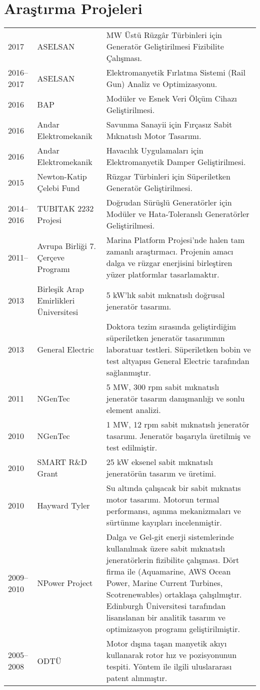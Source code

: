 \documentclass[a4paper,12pt]{article}
\begin{document}
\section{Araştırma Projeleri}
\begin{longtable}{lp{3cm}p{12cm}}
2017 & ASELSAN & MW Üstü Rüzgâr Türbinleri için Generatör Geliştirilmesi Fizibilite Çalışması.\\
2016--2017 & ASELSAN & Elektromanyetik Fırlatma Sistemi (Rail Gun) Analiz ve Optimizasyonu.\\
2016 & BAP & Modüler ve Esnek Veri Ölçüm Cihazı Geliştirilmesi.\\
2016 & Andar Elektromekanik & Savunma Sanayii için Fırçasız Sabit Mıknatıslı Motor Tasarımı.\\
2016 & Andar Elektromekanik & Havacılık Uygulamaları için Elektromanyetik Damper Geliştirilmesi.\\
2015 & Newton-Katip Çelebi Fund & Rüzgar Türbinleri için Süperiletken Generatör Geliştirilmesi.\\
2014--2016 & TUBITAK 2232 Projesi & Doğrudan Sürüşlü Generatörler için Modüler ve Hata-Toleranslı Generatörler Geliştirilmesi.\\
2011-- & Avrupa Birliği 7. Çerçeve Programı & Marina Platform Projesi'nde halen tam zamanlı araştırmacı. Projenin amacı dalga ve rüzgar enerjisini birleştiren yüzer platformlar tasarlamaktır.\\
2013 & Birleşik Arap Emirlikleri Üniversitesi & 5 kW'lık sabit mıknatıslı doğrusal jeneratör tasarımı.\\
2013 & General Electric & Doktora tezim sırasında geliştirdiğim süperiletken jeneratör tasarımının laboratuar testleri. Süperiletken bobin ve test altyapısı General Electric tarafından sağlanmıştır.\\
2011 & NGenTec & 5 MW, 300 rpm sabit mıknatıslı jeneratör tasarım danışmanlığı ve sonlu element analizi.\\
2010 & NGenTec & 1 MW, 12 rpm sabit mıknatıslı jeneratör tasarımı. Jeneratör başarıyla üretilmiş ve test edilmiştir.\\
2010 & SMART R\&D Grant & 25 kW eksenel sabit mıknatıslı jeneratörün tasarım ve üretimi.\\
2010 & Hayward Tyler & Su altında çalışacak bir sabit mıknatıs motor tasarımı. Motorun termal performansı, aşınma mekanizmaları ve sürtünme kayıpları incelenmiştir.\\
2009--2010 & NPower Project & Dalga ve Gel-git enerji sistemlerinde kullanılmak üzere sabit mıknatıslı jeneratörlerin fizibilite çalışması. Dört firma ile (Aquamarine, AWS Ocean Power, Marine Current Turbines, Scotrenewables) ortaklaşa çalışılmıştır. Edinburgh Üniversitesi tarafından lisanslanan bir analitik tasarım ve optimizasyon programı geliştirilmiştir.\\
2005--2008 & ODTÜ & Motor dışına taşan manyetik akıyı kullanarak rotor hız ve pozisyonunun tespiti. Yöntem ile ilgili uluslararası patent alınmıştır.\\
\end{longtable}
\end{document}
